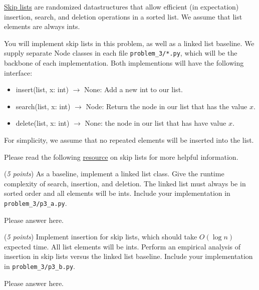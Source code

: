 \documentclass{hw_template}
\begin{document}
\begin{problem}
\href{https://en.wikipedia.org/wiki/Skip_list}{Skip lists}
are randomized datastructures that allow efficient (in expectation)
insertion, search, and deletion operations in a sorted list.
We assume that list elements are always ints.

You will implement skip lists in this problem, as well as a linked list baseline.
We supply separate Node classes in each file \texttt{problem\_3/*.py}, which will be the backbone of each implementation.
Both implementions will have the following interface:
\begin{itemize}
\item insert(list, x: int) $\rightarrow$ None: Add a new int to our list.
\item search(list, x: int) $\rightarrow$ Node: Return the node in our list that has the value $x$.
\item delete(list, x: int) $\rightarrow$ None: the node in our list that has have value $x$.
\end{itemize}
For simplicity, we assume that no repeated elements will be inserted into the list.

Please read the following
\href{https://ocw.mit.edu/courses/6-046j-introduction-to-algorithms-sma-5503-fall-2005/resources/l12_skiplists/}{resource}
on skip lists for more helpful information.

\begin{subproblem}
(\textit{5 points}) As a baseline, implement a linked list class.
Give the runtime complexity of search, insertion, and deletion.
The linked list must always be in sorted order and all elements will be ints.
Include your implementation in \texttt{problem\_3/p3\_a.py}.
\end{subproblem}
\begin{solution}
Please answer here.
\end{solution}


\begin{subproblem}
(\textit{5 points}) Implement insertion for skip lists, which should take $O(\log n)$ expected time.
All list elements will be ints.
Perform an empirical analysis of insertion in skip lists versus the linked list baseline.
Include your implementation in \texttt{problem\_3/p3\_b.py}.
\end{subproblem}
\begin{solution}
Please answer here.
\end{solution}



\end{problem}
\end{document}
